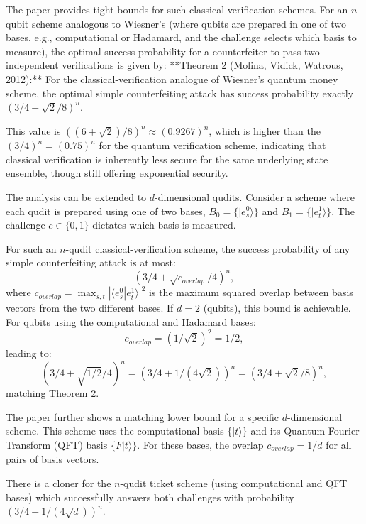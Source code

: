 \documentclass{article} %
\begin{document}
The paper provides tight bounds for such classical verification schemes.
For an $n$-qubit scheme analogous to Wiesner's (where qubits are prepared in one of two bases, e.g., computational or Hadamard, and the challenge selects which basis to measure), the optimal success probability for a counterfeiter to pass two independent verifications is given by:
**Theorem 2 (Molina, Vidick, Watrous, 2012):** For the classical-verification analogue of Wiesner's quantum money scheme, the optimal simple counterfeiting attack has success probability exactly $(3/4 + \sqrt{2}/8)^n$.

This value is $( (6+\sqrt{2})/8 )^n \approx (0.9267)^n$, which is higher than the $(3/4)^n = (0.75)^n$ for the quantum verification scheme, indicating that classical verification is inherently less secure for the same underlying state ensemble, though still offering exponential security.

The analysis can be extended to $d$-dimensional qudits. Consider a scheme where each qudit is prepared using one of two bases, $B_0 = \{|e_s^0\rangle\}$ and $B_1 = \{|e_t^1\rangle\}$. The challenge $c \in \{0,1\}$ dictates which basis is measured.
\begin{tcolorbox}[
    skin=freelance,
    title={Lemma 5 (Molina, Vidick, Watrous, 2012)}
]
    
For such an $n$-qudit classical-verification scheme, the success probability of any simple counterfeiting attack is at most: $$(3/4 + \sqrt{c_{overlap}}/4)^n,$$ where $c_{overlap} = \max_{s,t} |\langle e_s^0 | e_t^1 \rangle|^2$ is the maximum squared overlap between basis vectors from the two different bases.
If $d=2$ (qubits), this bound is achievable. \\
For qubits using the computational and Hadamard bases: $$c_{overlap} = (1/\sqrt{2})^2 = 1/2,$$ leading to: $$(3/4 + \sqrt{1/2}/4)^n = (3/4 + 1/(4\sqrt{2}))^n = (3/4 + \sqrt{2}/8)^n,$$ matching Theorem 2.
\end{tcolorbox}

The paper further shows a matching lower bound for a specific $d$-dimensional scheme. This scheme uses the computational basis $\{|t\rangle\}$ and its Quantum Fourier Transform (QFT) basis $\{F|t\rangle\}$. For these bases, the overlap $c_{overlap} = 1/d$ for all pairs of basis vectors.

\begin{tcolorbox}[
    skin=freelance,
    title={Lemma 6 (Molina, Vidick, Watrous, 2012)}
]

There is a cloner for the $n$-qudit ticket scheme (using computational and QFT bases) which successfully answers both challenges with probability $(3/4 + 1/(4\sqrt{d}))^n$.
\end{tcolorbox}
\end{document}
